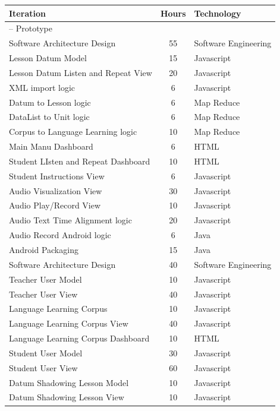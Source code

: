 \documentclass[12pt]{article}
\begin{document}
\begin{table}[htbp]
\begin{center}
  \begin{tabular}{ | lcl | }
\hline
Iteration &  Hours &  Technology  \\
\hline
-- Prototype && \\ 
Software Architecture Design & 55 & Software Engineering \\
Lesson Datum Model & 15  & Javascript \\
Lesson Datum Listen and Repeat View & 20  & Javascript \\
XML import logic  & 6 & Javascript \\ 
Datum to Lesson logic  & 6  & Map Reduce \\ 
DataList to Unit logic  & 6  & Map Reduce \\ 
Corpus to Language Learning logic  &  10  & Map Reduce \\ 
Main Manu Dashboard  & 6  & HTML \\ 
Student LIsten and Repeat Dashboard  & 10  & HTML \\ 
Student Instructions View  & 6  & Javascript \\ 
Audio Visualization View  & 30  & Javascript \\ 
Audio Play/Record View  & 10  & Javascript \\ 
Audio Text Time Alignment logic  & 20  & Javascript \\ 
Audio Record Android logic  &  6  & Java \\ 
Android Packaging  & 15  & Java \\ 
\hline 
Software Architecture Design & 40 & Software Engineering  \\ 
Teacher User Model  &  10 &  Javascript \\ 
Teacher User View  &  40  & Javascript \\ 
Language Learning Corpus  &  10 &  Javascript \\ 
Language Learning Corpus View  &  40  & Javascript \\ 
Language Learning Corpus Dashboard  &  10  & HTML \\ 
Student User Model  &  30  & Javascript \\ 
Student User View  &  60  & Javascript \\ 
Datum Shadowing Lesson Model  & 10 & Javascript \\ 
Datum Shadowing Lesson View  &  10  &  Javascript \\ 

\end{tabular}
\end{center}
\end{table}
\end{document}
